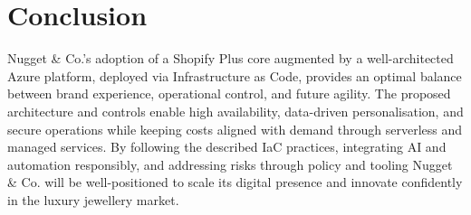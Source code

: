 \documentclass[12pt, a4paper, twoside]{article} %
\begin{document}
\section{Conclusion}
Nugget \& Co.'s adoption of a Shopify Plus core augmented by a well-architected Azure platform, deployed via Infrastructure as Code, provides an optimal balance between brand experience, operational control, and future agility. The proposed architecture and controls enable high availability, data-driven personalisation, and secure operations while keeping costs aligned with demand through serverless and managed services. By following the described IaC practices, integrating AI and automation responsibly, and addressing risks through policy and tooling Nugget \& Co. will be well-positioned to scale its digital presence and innovate confidently in the luxury jewellery market.


\end{document}
